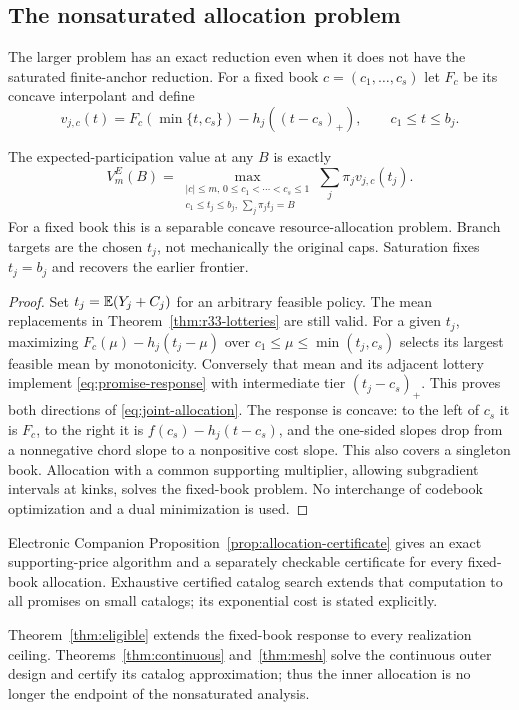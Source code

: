 \subsection{The nonsaturated allocation problem}
The larger problem has an exact reduction even when it does not have the saturated finite-anchor reduction. For a fixed book $c=(c_1,\ldots,c_s)$ let $F_c$ be its concave interpolant and define
\begin{equation}\label{eq:promise-response}
 v_{j,c}(t)=F_c(\min\{t,c_s\})-h_j((t-c_s)_+),\qquad c_1\leq t\leq b_j.
\end{equation}
\begin{proposition}\label{prop:allocation}
The expected-participation value at any $B$ is exactly
\begin{equation}\label{eq:joint-allocation}
 V_m^E(B)=\max_{\substack{|c|\leq m,\,0\leq c_1<\cdots<c_s\leq1\\
 c_1\leq t_j\leq b_j,\,\sum_j\pi_jt_j=B}}
 \sum_j\pi_j v_{j,c}(t_j).
\end{equation}
For a fixed book this is a separable concave resource-allocation problem. Branch targets are the chosen $t_j$, not mechanically the original caps. Saturation fixes $t_j=b_j$ and recovers the earlier frontier.
\end{proposition}
\begin{proof}
Set $t_j=\mathbb E(Y_j+C_j)$ for an arbitrary feasible policy. The mean replacements in Theorem~\ref{thm:r33-lotteries} are still valid. For a given $t_j$, maximizing $F_c(\mu)-h_j(t_j-\mu)$ over $c_1\leq\mu\leq\min(t_j,c_s)$ selects its largest feasible mean by monotonicity. Conversely that mean and its adjacent lottery implement \eqref{eq:promise-response} with intermediate tier $(t_j-c_s)_+$. This proves both directions of \eqref{eq:joint-allocation}. The response is concave: to the left of $c_s$ it is $F_c$, to the right it is $f(c_s)-h_j(t-c_s)$, and the one-sided slopes drop from a nonnegative chord slope to a nonpositive cost slope. This also covers a singleton book. Allocation with a common supporting multiplier, allowing subgradient intervals at kinks, solves the fixed-book problem. No interchange of codebook optimization and a dual minimization is used.
\end{proof}

Electronic Companion Proposition~\ref{prop:allocation-certificate} gives an exact supporting-price algorithm and a separately checkable certificate for every fixed-book allocation. Exhaustive certified catalog search extends that computation to all promises on small catalogs; its exponential cost is stated explicitly.

Theorem~\ref{thm:eligible} extends the fixed-book response to every realization ceiling. Theorems~\ref{thm:continuous} and~\ref{thm:mesh} solve the continuous outer design and certify its catalog approximation; thus the inner allocation is no longer the endpoint of the nonsaturated analysis.
